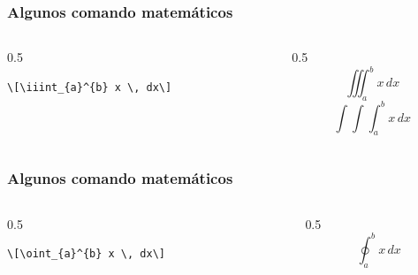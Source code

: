 \documentclass[12pt,aspectratio=169,ignorenonframetext]{ltxbeamer}
\begin{document}
\begin{frame}[fragile]
\frametitle{Algunos comando matemáticos}

\begin{columns}
    \begin{column}{0.5\textwidth}
        \begin{verbatim}
\[\iiint_{a}^{b} x \, dx\]
        \end{verbatim}
    \end{column}
    {\color{gray} \vline}
    \begin{column}{0.5\textwidth}
        \[\iiint_{a}^{b} x \, dx\]
        \pause
        \[\int\int\int_{a}^b x \, dx\]
    \end{column}
\end{columns}
\end{frame}





\begin{frame}[fragile]
\frametitle{Algunos comando matemáticos}

\begin{columns}
    \begin{column}{0.5\textwidth}
        \begin{verbatim}
\[\oint_{a}^{b} x \, dx\]
        \end{verbatim}
    \end{column}
    {\color{gray} \vline}
    \begin{column}{0.5\textwidth}
        \[\oint_{a}^{b} x \, dx\]
    \end{column}
\end{columns}
\end{frame}
\end{document}
